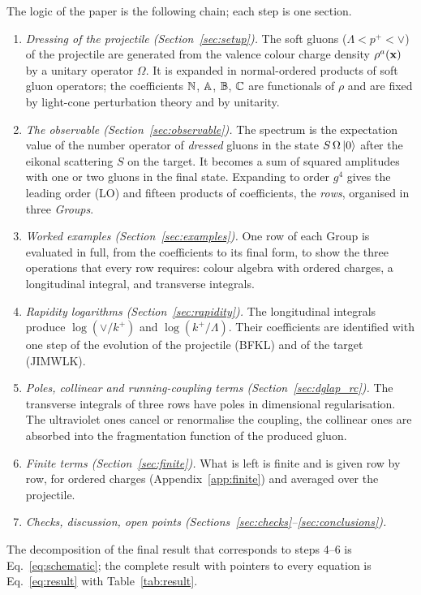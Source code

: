 The logic of the paper is the following chain; each step is one section.
\begin{enumerate}
\item \emph{Dressing of the projectile (Section~\ref{sec:setup}).} The soft gluons ($\Lambda<p^+<\vee$) of the projectile are generated from the valence colour charge density $\rho^a(\mathbf{x})$ by a unitary operator $\Omega$. It is expanded in normal-ordered products of soft gluon operators; the coefficients $\mathbb{N}$, $\mathbb{A}$, $\mathbb{B}$, $\mathbb{C}$ are functionals of $\rho$ and are fixed by light-cone perturbation theory and by unitarity.
\item \emph{The observable (Section~\ref{sec:observable}).} The spectrum is the expectation value of the number operator of \emph{dressed} gluons in the state $S\,\Omega\ket0$ after the eikonal scattering $S$ on the target. It becomes a sum of squared amplitudes with one or two gluons in the final state. Expanding to order $g^4$ gives the leading order (LO) and fifteen products of coefficients, the \emph{rows}, organised in three \emph{Groups}.
\item \emph{Worked examples (Section~\ref{sec:examples}).} One row of each Group is evaluated in full, from the coefficients to its final form, to show the three operations that every row requires: colour algebra with ordered charges, a longitudinal integral, and transverse integrals.
\item \emph{Rapidity logarithms (Section~\ref{sec:rapidity}).} The longitudinal integrals produce $\log(\vee/k^+)$ and $\log(k^+/\Lambda)$. Their coefficients are identified with one step of the evolution of the projectile (BFKL) and of the target (JIMWLK).
\item \emph{Poles, collinear and running-coupling terms (Section~\ref{sec:dglap_rc}).} The transverse integrals of three rows have poles in dimensional regularisation. The ultraviolet ones cancel or renormalise the coupling, the collinear ones are absorbed into the fragmentation function of the produced gluon.
\item \emph{Finite terms (Section~\ref{sec:finite}).} What is left is finite and is given row by row, for ordered charges (Appendix~\ref{app:finite}) and averaged over the projectile.
\item \emph{Checks, discussion, open points (Sections~\ref{sec:checks}--\ref{sec:conclusions}).}
\end{enumerate}
The decomposition of the final result that corresponds to steps 4--6 is Eq.~\eqref{eq:schematic}; the complete result with pointers to every equation is Eq.~\eqref{eq:result} with Table~\ref{tab:result}.

